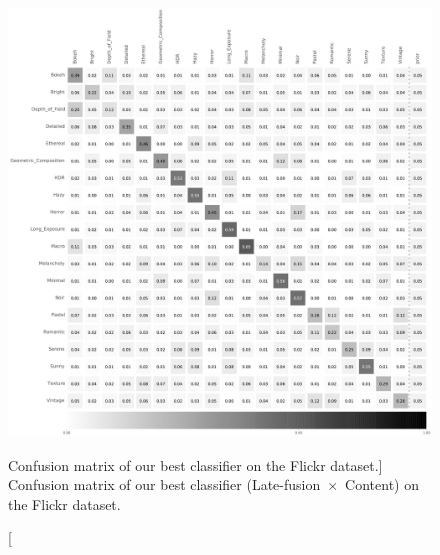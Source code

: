 
\begin{figure}[ht!]
\centering
\includegraphics[width=1\linewidth]{../style/figures/evaluation/flickr_conf.pdf}
\caption
[Confusion matrix of our best classifier on the Flickr dataset.]
{Confusion matrix of our best classifier (\mbox{Late-fusion $\times$ Content}) on the Flickr dataset.}
\label{fig:flickr_conf}
\end{figure}

